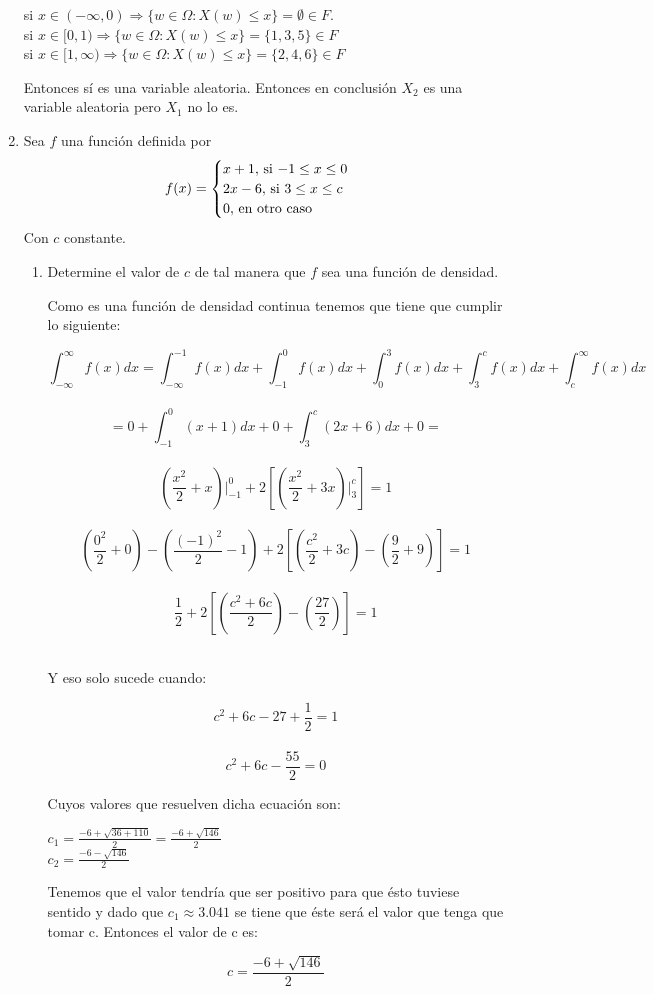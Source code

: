 \documentclass[12pt,a4paper]{report}
\begin{document}
\begin{enumerate}
{			\begin{center}
			    si $x\in (-\infty,0) \Rightarrow \lbrace w\in \Omega: X(w) \leq x \rbrace = \emptyset \in F. $\\
			    si $x\in [0,1) \Rightarrow \lbrace w \in \Omega: X(w) \leq x \rbrace = \lbrace 1,3,5 \rbrace \in F$  \\
			    si $x\in [1,\infty) \Rightarrow \lbrace w\in \Omega: X(w)\leq x \rbrace = \lbrace 2,4,6 \rbrace \in F$
			\end{center}
		    Entonces sí es una variable aleatoria. Entonces en conclusión $X_{2}$ es una variable aleatoria pero $X_{1}$ no lo es.
		}
		\item {
			Sea $f$ una función definida por
			\[
				f(x) = \begin{cases}
								x+1, $ si $ -1 \leq x \leq 0\\
								2x-6, $ si $ 3 \leq x \leq c\\
								0, $ en otro caso$
			\end{cases}
			\]
			Con $c$ constante.
			\begin{enumerate}
				\item{
					Determine el valor de $c$ de tal manera que $f$ sea una función de
					densidad.
					
					
					Como es una función de densidad continua tenemos que tiene que cumplir lo siguiente:
					\begin{center}
					    $$\int_{-\infty}^{\infty} f(x) dx = \int_{-\infty}^{-1}f(x)dx+\int_{-1}^{0}f(x)dx+\int_{0}^{3}f(x)dx+\int_{3}^{c}f(x)dx+\int_{c}^{\infty}f(x)dx$$\\
					    $$=0+\int_{-1}^{0}(x+1)dx+0+\int_{3}^{c}(2x+6)dx+0=$$\\ 
					    $$(\frac{x^2}{2}+x)|_{-1}^{0}+2[(\frac{x^2}{2}+3x)|_{3}^{c}]=1$$\\
					    $$(\frac{0^2}{2}+0)-(\frac{(-1)^2}{2}-1)+2[(\frac{c^2}{2}+3c)-(\frac{9}{2}+9)]=1$$ \\
					    $$\frac{1}{2}+2[(\frac{c^2+6c}{2})-(\frac{27}{2})]=1$$\\ 
					    \end{center}
					 Y eso solo sucede cuando: 
					\begin{center}
					    $$c^2+6c-27+\frac{1}{2}=1$$\\
					    $$c^2+6c-\frac{55}{2}=0$$
					\end{center}   
					Cuyos valores que resuelven dicha ecuación son:\\
					\begin{center}
					    $c_{1}=\frac{-6+\sqrt{36+110}}{2}=\frac{-6+\sqrt{146}}{2}$\\
					    $c_{2}=\frac{-6-\sqrt{146}}{2}$
					\end{center}
					Tenemos que el valor tendría que ser positivo para que ésto tuviese sentido y dado que $c_{1}\approx 3.041 $ se tiene que éste será el valor que tenga que tomar c. Entonces el valor de c es:
					\begin{center}
					   $$ c=\frac{-6+\sqrt{146}}{2}$$
					\end{center}
				    }
				

\end{enumerate}}
\end{enumerate}
\end{document}
